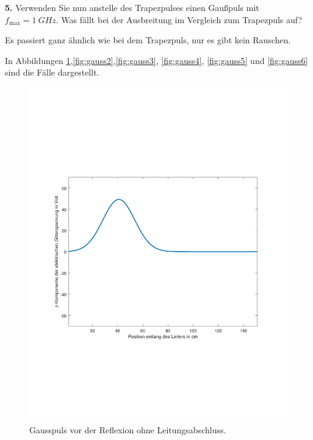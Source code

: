 \documentclass[Protokollheft.tex]{subfiles}
\begin{document}
\begin{framed}
	\noindent \textbf{5.} Verwenden Sie nun anstelle des Trapezpulses einen Gaußpuls
mit $f_{\text{max}}=\SI{1}{GHz}$. Was fällt bei der Ausbreitung im Vergleich
zum Trapezpuls auf?\label{exer:gaussExcitation}
\end{framed}

Es passiert ganz ähnlich wie bei dem Trapezpuls, nur es gibt kein Rauschen.

In Abbildungen  \ref{fig:gauss1},\ref{fig:gauss2},\ref{fig:gauss3}, \ref{fig:gauss4}, \ref{fig:gauss5} und \ref{fig:gauss6} sind die Fälle dargestellt.
\begin{figure}[ht]
	\centering
	\includegraphics[trim = 20mm 65mm 20mm 65mm, clip,width=0.7\linewidth]{untitled1.pdf}
	\caption{Gausspuls vor der Reflexion ohne Leitungsabschluss.}\label{fig:gauss1}
\end{figure}
\end{document}
